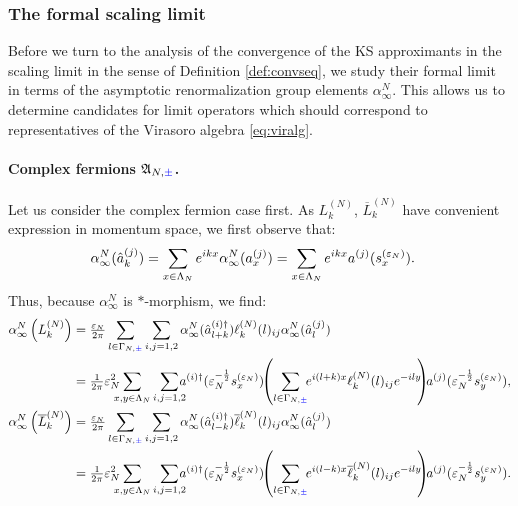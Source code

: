 \documentclass[a4paper, 11pt]{article}
\newcommand{\fA}{\mathfrak{A}}\newcommand{\cA}{\mathcal{A}}\newcommand{\dA}{\mathds{A}}\newcommand{\sA}{\mathscr{A}}
\DeclareMathOperator{\1}{\mathds{1}}
\begin{document}
\subsubsection{The formal scaling limit}
\label{sec:formallim}
Before we turn to the analysis of the convergence of the KS approximants in the scaling limit in the sense of Definition \ref{def:convseq}, we study their formal limit in terms of the asymptotic renormalization group elements $\alpha^{N}_{\infty}$. This allows us to determine candidates for limit operators which should correspond to representatives of the Virasoro algebra \eqref{eq:viralg}.
\paragraph{Complex fermions $\fA_{N,{\color{blue}\pm}}$.}
Let us consider the complex fermion case first. As $L^{(N)}_{k}$, $\overline{L}^{(N)}_{k}$ have convenient expression in momentum space, we first observe that:
\begin{align}
\label{eq:rglimalgFT}
\alpha^{N}_{\infty}(\hat{a}^{(j)}_{k}) & = \sum_{x\in\Lambda_{N}}e^{ikx}\alpha^{N}_{\infty}(a^{(j)}_{x}) = \sum_{x\in\Lambda_{N}}e^{ikx}a^{(j)}(s^{(\varepsilon_{N})}_{x}).
\end{align}
Thus, because $\alpha^{N}_{\infty}$ is $*$-morphism, we find:
\begin{align}
\label{eq:limrglatvira}
\alpha^{N}_{\infty}\left(L^{(N)}_{k}\right) & = \tfrac{\vep_{N}}{2\pi}\sum_{l\in\Gamma_{N,{\color{blue}\pm}}}\sum_{i,j=1,2}\alpha^{N}_{\infty}(\hat{a}^{(i)\dag}_{l+k})\ell^{(N)}_{k}(l)_{ij}\alpha^{N}_{\infty}(\hat{a}^{(j)}_{l}) \\ \nonumber
 & = \tfrac{1}{2\pi}\vep_{N}^{2}\!\!\!\!\sum_{x,y\in\Lambda_{N}}\sum_{i,j=1,2}\!\!\!\!a^{(i)\dag}(\vep_{N}^{-\frac{1}{2}} s^{(\vep_{N})}_{x})\!\!\left(\sum_{l\in\Gamma_{N,{\color{blue}\pm}}} \!\!e^{i(l+k)x}\ell^{(N)}_{k}(l)_{ij}e^{-ily} \!\!\right) \!\!a^{(j)}(\vep_{N}^{-\frac{1}{2}} s^{(\vep_{N})}_{y}),\\ \nonumber
\alpha^{N}_{\infty}\left(\overline{L}^{(N)}_{k}\right) & = \tfrac{\vep_{N}}{2\pi}\sum_{l\in\Gamma_{N,{\color{blue}\pm}}}\sum_{i,j=1,2}\alpha^{N}_{\infty}(\hat{a}^{(i)\dag}_{l-k})\overline{\ell}^{(N)}_{k}(l)_{ij}\alpha^{N}_{\infty}(\hat{a}^{(j)}_{l}) \\ \nonumber
 & = \tfrac{1}{2\pi}\vep_{N}^{2}\!\!\!\!\sum_{x,y\in\Lambda_{N}}\sum_{i,j=1,2}\!\!\!\!a^{(i)\dag}(\vep_{N}^{-\frac{1}{2}} s^{(\vep_{N})}_{x}) \!\!\left(\sum_{l\in\Gamma_{N,{\color{blue}\pm}}} \!\!e^{i(l-k)x}\overline{\ell}^{(N)}_{k}(l)_{ij}e^{-ily} \!\!\right) \!\!a^{(j)}(\vep_{N}^{-\frac{1}{2}} s^{(\vep_{N})}_{y}).
\end{align}
\end{document}
